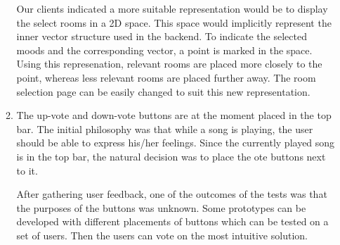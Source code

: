 \begin{enumerate}
\begin{enumerate}
Our clients indicated a more suitable representation would be to display the select rooms in a 2D space.
This space would implicitly represent the inner vector structure used in the backend.
To indicate the selected moods and the corresponding vector, a point is marked in the space.
Using this represenation, relevant rooms are placed more closely to the point, whereas less relevant rooms are placed further away. The room selection page can be easily changed to suit this new representation.

\item The up-vote and down-vote buttons are at the moment placed in the top bar.
The initial philosophy was that while a song is playing, the user should be able to express his/her feelings.
Since the currently played song is in the top bar, the natural decision was to place the ote buttons next to it.

After gathering user feedback, one of the outcomes of the tests was that the purposes of the buttons was unknown.
Some prototypes can be developed with different placements of buttons which can be tested on a set of users.
Then the users can vote on the most intuitive solution.
\end{enumerate}
\end{enumerate}